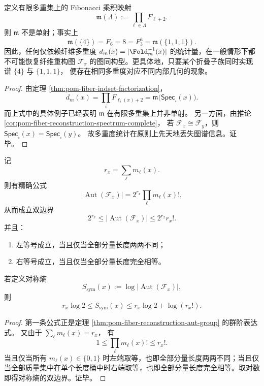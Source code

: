 \begin{proposition}\label{prop:conclusion-fiber-multiplicity-product-noninjective}
定义有限多重集上的 Fibonacci 乘积映射
\[
\mathfrak m(\Lambda):=\prod_{\ell\in\Lambda}F_{\ell+2}.
\]
则 \(\mathfrak m\) 不是单射；事实上
\[
\mathfrak m(\{4\})=F_6=8=F_3^3=\mathfrak m(\{1,1,1\}).
\]
因此，任何仅依赖纤维多重度
\(
d_m(x)=|\Fold_m^{-1}(x)|
\)
的统计量，在一般情形下都不可能恢复纤维重构图 \(\mathcal F_x\) 的图同构型。更具体地，只要某个折叠子族同时实现谱
\(
\{4\}
\)
与
\(
\{1,1,1\}
\)，
便存在相同多重度对应不同内部几何的现象。
\end{proposition}
\begin{proof}
由定理 \ref{thm:pom-fiber-indset-factorization}，
\[
d_m(x)=\prod_i F_{\ell_i(x)+2}
=
\mathfrak m\!\bigl(\mathsf{Spec}_{\square}(x)\bigr).
\]
而上式中的具体例子已经表明 \(\mathfrak m\) 在有限多重集上并非单射。
另一方面，由推论 \ref{cor:pom-fiber-reconstruction-spectrum-complete}，
若 \(\mathcal F_x\cong \mathcal F_y\)，则
\(
\mathsf{Spec}_{\square}(x)=\mathsf{Spec}_{\square}(y)
\)。
故多重度统计在原则上先天地丢失图谱信息。证毕。
\end{proof}

\begin{theorem}[固定分量数下的对称熵极值定律]\label{thm:conclusion-fiber-symmetry-entropy-extremals}
记
\[
r_x=\sum_{\ell}m_\ell(x).
\]
则有精确公式
\[
|\operatorname{Aut}(\mathcal F_x)|=2^{r_x}\prod_{\ell}m_\ell(x)!,
\]
从而成立双边界
\[
2^{r_x}\le |\operatorname{Aut}(\mathcal F_x)|\le 2^{r_x}r_x!.
\]
并且：
\begin{enumerate}
\item 左等号成立，当且仅当全部分量长度两两不同；
\item 右等号成立，当且仅当全部分量长度完全相等。
\end{enumerate}
若定义对称熵
\[
S_{\mathrm{sym}}(x):=\log |\operatorname{Aut}(\mathcal F_x)|,
\]
则
\[
r_x\log 2\le S_{\mathrm{sym}}(x)\le r_x\log 2+\log(r_x!).
\]
\end{theorem}
\begin{proof}
第一条公式正是定理 \ref{thm:pom-fiber-reconstruction-aut-group} 的群阶表达式。
又由于
\(
\sum_{\ell}m_\ell(x)=r_x
\)，
有
\[
1\le \prod_\ell m_\ell(x)!\le r_x!.
\]
当且仅当所有 \(m_\ell(x)\in\{0,1\}\) 时左端取等，也即全部分量长度两两不同；当且仅当全部质量集中在单个长度桶中时右端取等，也即全部分量长度完全相等。取对数即得对称熵的双边界。证毕。
\end{proof}

